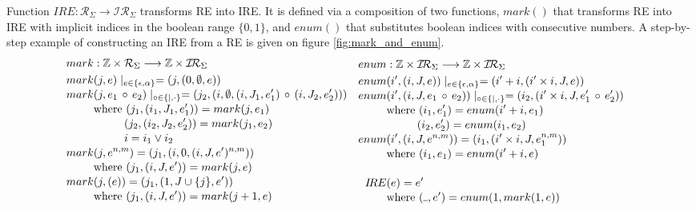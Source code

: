 \documentclass[AMA,STIX1COL]{WileyNJD-v2}
\newcommand{\Xund}{\rule{.4em}{.4pt}}
\newcommand{\XI}{\mathcal{I}}
\newcommand{\XIR}{\XI\!\XR}
\newcommand{\XR}{\mathcal{R}}
\newcommand{\YZ}{\mathbb{Z}}
\newcommand{\IRE}{I\!RE}
\begin{document}
Function $\IRE: \XR_\Sigma \rightarrow \XIR_\Sigma$ transforms RE into IRE.
It is defined via a composition of two functions,
$mark()$ that transforms RE into IRE with implicit indices in the boolean range $\{0, 1\}$,
and $enum()$ that substitutes boolean indices with consecutive numbers.
A step-by-step example of constructing an IRE from a RE is given on figure \ref{fig:mark_and_enum}.
%
    \begin{align*}
    &\begin{aligned}
        mark &: \YZ \times \XR_\Sigma \longrightarrow \YZ \times \XIR_\Sigma \\
        mark &(j, e) \mid_{e \in \{\epsilon, \alpha\}} = (j, (0, \emptyset, e)) \\[-0.2em]
        mark &(j, e_1 \,\circ\, e_2) \mid_{\circ \in \{|,\cdot\}} = (j_2, (i, \emptyset,
            (i, J_1, e'_1) \,\circ\,
            (i, J_2, e'_2)
            )) \\[-0.2em]
            &\text{where }            (j_1, (i_1, J_1, e'_1)) = mark(j, e_1) \\[-0.2em]
            &\space{\hphantom{where }}(j_2, (i_2, J_2, e'_2)) = mark(j_1, e_2) \\[-0.2em]
            &\space{\hphantom{where }}i = i_1 \vee i_2 \\[-0.2em]
        mark &(j, e^{n, m}) = (j_1, (i, 0, (i, J, e')^{n, m})) \\[-0.2em]
            &\text{where } (j_1, (i, J, e')) = mark(j, e) \\[-0.2em]
        mark &(j, (e)) = (j_1, (1, J \cup \{j\}, e')) \\[-0.2em]
            &\text{where } (j_1, (i, J, e')) = mark(j + 1, e)
    \end{aligned}
    &&\begin{aligned}
        enum &: \YZ \times \XIR_\Sigma \longrightarrow \YZ \times \XIR_\Sigma \\
        enum &(i', (i, J, e)) \mid_{e \in \{\epsilon, \alpha\}}
            = (i' + i, (i' \times i, J, e))
        \\[-0.2em]
        enum &(i', (i, J, e_1 \,\circ\, e_2)) \mid_{\circ \in \{|,\cdot\}}
            = (i_2, (i' \times i, J, e'_1 \,\circ\, e'_2)) \\[-0.2em]
            &\text{where }            (i_1, e'_1) = enum(i' + i, e_1) \\[-0.2em]
            &\space{\hphantom{where }}(i_2, e'_2) = enum(i_1, e_2)
        \\[-0.2em]
        enum &(i', (i, J, e^{n,m})) = (i_1, (i' \times i, J, e_1^{n,m})) \\[-0.2em]
            &\text{where }
                (i_1, e_1) = enum(i' + i, e)
        \\[-0.2em]
        \\[-0.2em]
        \IRE&(e) = e' \\[-0.2em]
            &\text{where }(\Xund, e') = enum(1, mark(1, e))
        \\[-0.2em]
    \end{aligned}
    \end{align*}
\end{document}
